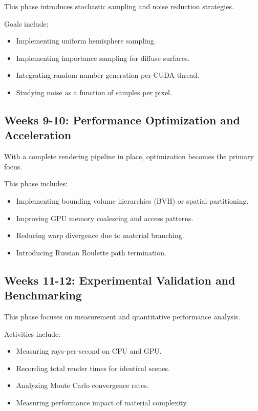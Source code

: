 \documentclass[11pt]{article}
\begin{document}
This phase introduces stochastic sampling and noise reduction strategies.

Goals include:
\begin{itemize}
    \item Implementing uniform hemisphere sampling.
    \item Implementing importance sampling for diffuse surfaces.
    \item Integrating random number generation per CUDA thread.
    \item Studying noise as a function of samples per pixel.
\end{itemize}

\subsection*{Weeks 9-10: Performance Optimization and Acceleration}

With a complete rendering pipeline in place, optimization becomes the primary focus.

This phase includes:
\begin{itemize}
    \item Implementing bounding volume hierarchies (BVH) or spatial partitioning.
    \item Improving GPU memory coalescing and access patterns.
    \item Reducing warp divergence due to material branching.
    \item Introducing Russian Roulette path termination.
\end{itemize}

\subsection*{Weeks 11-12: Experimental Validation and Benchmarking}

This phase focuses on measurement and quantitative performance analysis.

Activities include:
\begin{itemize}
    \item Measuring rays-per-second on CPU and GPU.
    \item Recording total render times for identical scenes.
    \item Analyzing Monte Carlo convergence rates.
    \item Measuring performance impact of material complexity.
\end{itemize}
\end{document}
